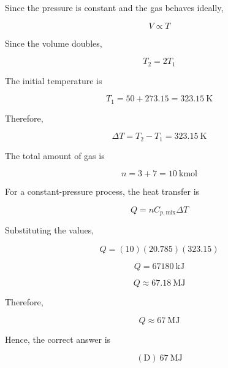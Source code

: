 \documentclass[12pt]{article}
\begin{document}
Since the pressure is constant and the gas behaves ideally,

\begin{equation*}
V\propto T
\end{equation*}

Since the volume doubles,

\begin{equation*}
T_2=2T_1
\end{equation*}

The initial temperature is

\begin{equation*}
T_1=50+273.15=323.15\ \mathrm{K}
\end{equation*}

Therefore,

\begin{equation*}
\Delta T=T_2-T_1=323.15\ \mathrm{K}
\end{equation*}

The total amount of gas is

\begin{equation*}
n=3+7=10\ \mathrm{kmol}
\end{equation*}

For a constant-pressure process, the heat transfer is

\begin{equation*}
Q=nC_{p,\mathrm{mix}}\Delta T
\end{equation*}

Substituting the values,

\begin{equation*}
Q=(10)(20.785)(323.15)
\end{equation*}

\begin{equation*}
Q=67180\ \mathrm{kJ}
\end{equation*}

\begin{equation*}
Q\approx67.18\ \mathrm{MJ}
\end{equation*}

Therefore,

\begin{equation*}
\boxed{Q\approx67\ \mathrm{MJ}}
\end{equation*}

Hence, the correct answer is

\begin{equation*}
\boxed{\mathrm{(D)}\ 67\ \mathrm{MJ}}
\end{equation*}
\end{document}
